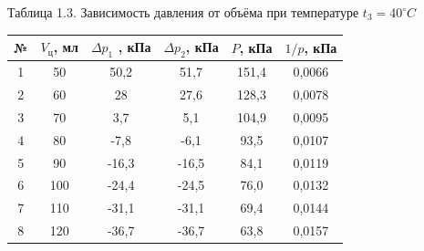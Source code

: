 \documentclass[12pt]{article}
\begin{document}
\newpage
\begin{table}[h!]
\begin{center}
Таблица 1.3. Зависимость давления от объёма при температуре  $t_{3}=40^{\circ} C$

\begin{tabular}{|c|c|c|c|c|c|}
\hline
№ &	$V_{ц}$, мл	&$\Delta p_{1}$ , кПа	&$\Delta p_{2}$, кПа	&$P$, кПа&	$1/p$, кПа \\
\hline
1&		50&		50,2&		51,7&		151,4&		0,0066\\
\hline
2&		60&		28&		27,6&		128,3&		0,0078\\
\hline
3&		70&		3,7	&	5,1&		104,9	&	0,0095\\
\hline
4&		80&		-7,8&		-6,1&		93,5&		0,0107\\
\hline
5&		90&		-16,3	&	-16,5	&	84,1&		0,0119\\
\hline
6&		100&		-24,4&		-24,5&	76,0&		0,0132\\
\hline
7&		110&		-31,1&		-31,1	&	69,4	&	0,0144\\
\hline
8&		120&		-36,7	&	-36,7	&	63,8	&	0,0157\\
\hline
\end{tabular}
\end{center}
\end{table} 
\end{document}
